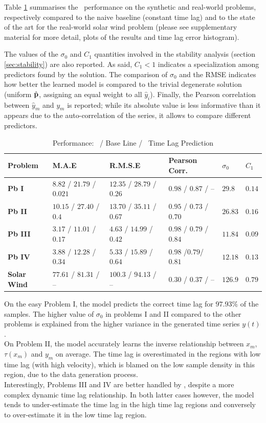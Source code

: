 Table \ref{tab:results_syn} summarises the \XX\ performance on the synthetic and real-world problems, respectively compared to the naive baseline (constant time lag) and to the state of the art for the real-world solar wind problem (please see supplementary material for more detail, plots of the results and time lag error histogram). 

The values of the $\sigma_0$ and $C_1$ quantities involved in the stability analysis (section \ref{sec:stability}) are also reported. As said, $C_1 < 1$ indicates a specialization among predictors found by the solution. The comparison of $\sigma_0$ and the RMSE indicates how better the learned model is compared to the trivial degenerate solution (uniform $\hat {\bf p}$, assigning an equal weight to all $\hat y_i$). 
Finally, the Pearson correlation between $\hat y_m$ and $y_m$ is reported; while its absolute value is less informative than it appears due to the auto-correlation of the series, it allows to compare different predictors. 

\begin{table}
  \caption{Performance: \XX  \ / Base Line / \XX  \ Time Lag Prediction}\label{tab:results_syn}
  \centering
  \begin{tabular}{ l l l l l l}
  \hline
  Problem &  M.A.E & R.M.S.E & Pearson Corr. & $\sigma_0$ & $C_1$\\
  \hline
  \textbf{Pb I} & $8.82$ / $21.79$ / $0.021$  & $12.35$ / $28.79$ / $0.26$ & $0.98$ / $0.87$ / -- & $29.8$ & $0.14$\\
  \textbf{Pb II} & $10.15$ / $27.40$ / $0.4$ & $13.70$ / $35.11$ / $0.67$ & $0.95$ / $0.73$ / $0.70$ & $26.83$ & $0.16$\\
  \textbf{Pb III} & $3.17$ / $11.01$ / $0.17$ & $4.63$ / $14.99$ / $0.42$ & $0.98$ / $0.79$ / $0.84$ & $11.84$ & $0.09$\\
  \textbf{Pb IV} & $3.88$ / $12.28$ / $0.34$ & $5.33$ / $15.89$ / $0.64$ & $0.98$ /$0.79$/ $0.81$ & $12.18$ & $0.13$\\
  \textbf{Solar Wind} & $77.61$ / $81.31$ / -- & $100.3$ / $94.13$ / -- & $0.30$ / $0.37$ / -- & $126.9$ & $0.79$\\
  \hline
  \end{tabular}
\end{table}

On the easy Problem I, the model predicts the correct time lag for $97.93\%$ of the samples. The higher value of $\sigma_0$ in problems I and II compared to the other problems is explained from the higher variance in the generated  time series $y(t)$. \\
On Problem II, the model accurately learns the inverse relationship between $x_m$, $\tau(x_m)$ and $y_m$ on average.  The time lag is overestimated in the regions with low time lag (with high velocity), which is blamed on the low sample density in this region, due to the data generation process. \\
Interestingly, Problems III and IV are better handled by \XX, despite a more complex dynamic time lag relationship. In both latter cases however, the model tends to under-estimate the time lag in the high time lag regions and conversely to over-estimate it in the low time lag region. 

